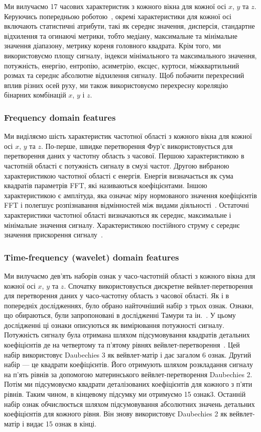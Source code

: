 \documentclass[]{iptconf}
\begin{document}
Ми вилучаємо 17 часових характеристик з кожного вікна для кожної осі $x$, $y$ та $z$. Керуючись попередньою роботою~\cite{8}, окремі характеристики для кожної осі включають статистичні атрибути, такі як середнє значення, дисперсія, стандартне відхилення та огинаючі метрики, тобто медіану, максимальне та мінімальне значення діапазону, метрику кореня головного квадрата. Крім того, ми використовуємо площу сигналу, індекси мінімального та максимального значення, потужність, енергію, ентропію, асиметрію, ексцес, куртоси, міжквартильний розмах та середнє абсолютне відхилення сигналу. Щоб побачити перехресний вплив різних осей руху, ми також використовуємо перехресну кореляцію бінарних комбінацій $x$, $y$ і $z$.

\subsubsection{Frequency domain features}

Ми виділяємо шість характеристик частотної області з кожного вікна для кожної осі $x$, $y$ та $z$. По-перше, швидке перетворення Фур'є використовується для перетворення даних у частотну область з часової. Першою характеристикою в частотній області є потужність сигналу в смузі частот. Другою вибраною характеристикою частотної області є енергія. Енергія визначається як сума квадратів параметрів FFT, які називаються коефіцієнтами. Іншою характеристикою є амплітуда, яка означає міру нормованого значення коефіцієнтів FFT і полегшує розпізнавання відмінностей між видами діяльності~\cite{3}. Остаточні характеристики частотної області визначаються як середнє, максимальне і мінімальне значення сигналу. Характеристикою постійного струму є середнє значення прискорення сигналу~\cite{4}.

\subsubsection{Time-frequency (wavelet) domain features}

Ми вилучаємо дев'ять наборів ознак у часо-частотній області з кожного вікна для кожної осі $x$, $y$ та $z$. Спочатку використовується дискретне вейвлет-перетворення для перетворення даних у часо-частотну область з часової області. Як і в попередніх дослідженнях, було обрано найточніший набір з трьох ознак. Ознаки, що обираються, були запропоновані в дослідженні Тамури та ін.~\cite{5}. У цьому дослідженні ці ознаки описуються як вимірювання потужності сигналу. Потужність сигналу була отримана шляхом підсумовування квадратів детальних коефіцієнтів де на четвертому та п'ятому рівнях вейвлет-перетворення~\cite{3}. Цей набір використовує Daubechies 3 як вейвлет-матір і дає загалом 6 ознак. Другий набір --- це квадрати коефіцієнтів. Його отримують шляхом розкладання сигналу на п'ять рівнів за допомогою материнського вейвлет-перетворення Daubechies 2. Потім ми підсумовуємо квадрати деталізованих коефіцієнтів для кожного з п'яти рівнів. Таким чином, в кінцевому підсумку ми отримуємо 15 ознак3. Останній набір ознак обчислюється шляхом підсумовування абсолютних значень детальних коефіцієнтів для кожного рівня. Він знову використовує Daubechies 2 як вейвлет-матір і видає 15 ознак в кінці.
\end{document}
